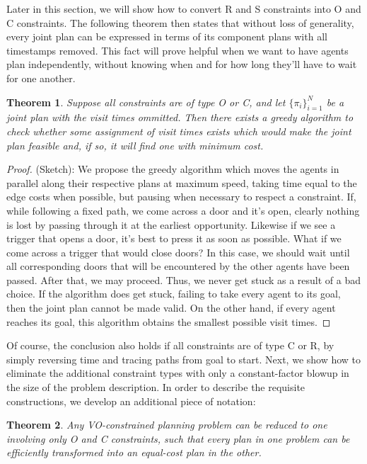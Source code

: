 \documentclass[letterpaper]{article}
\newtheorem{thm}{Theorem}
\begin{document}
Later in this section, we will show how to convert R and S constraints into O and C constraints. The following theorem then states that without loss of generality, every joint plan can be expressed in terms of its component plans with all timestamps removed. This fact will prove helpful when we want to have agents plan independently, without knowing when and for how long they'll have to wait for one another.

\begin{thm}
\label{thm:greedy}
Suppose all constraints are of type O or C, and let $\{\pi_i\}_{i=1}^N$ be a joint plan with the visit times ommitted. Then there exists a greedy algorithm to check whether some assignment of visit times exists which would make the joint plan feasible and, if so, it will find one with minimum cost.
\end{thm} 

\begin{proof}
(Sketch): We propose the greedy algorithm which moves the agents in parallel along their respective plans at maximum speed, taking time equal to the edge costs when possible, but pausing when necessary to respect a constraint. If, while following a fixed path, we come across a door and it's open, clearly nothing is lost by passing through it at the earliest opportunity. Likewise if we see a trigger that opens a door, it's best to press it as soon as possible. What if we come across a trigger that would close doors? In this case, we should wait until all corresponding doors that will be encountered by the other agents have been passed. After that, we may proceed. Thus, we never get stuck as a result of a bad choice. If the algorithm does get stuck, failing to take every agent to its goal, then the joint plan cannot be made valid. On the other hand, if every agent reaches its goal, this algorithm obtains the smallest possible visit times.
\end{proof}

Of course, the conclusion also holds if all constraints are of type C or R, by simply reversing time and tracing paths from goal to start. Next, we show how to eliminate the additional constraint types with only a constant-factor blowup in the size of the problem description. In order to describe the requisite constructions, we develop an additional piece of notation: 

\begin{thm}
\label{thm:OC}
Any VO-constrained planning problem can be reduced to one involving only O and C constraints, such that every plan in one problem can be efficiently transformed into an equal-cost plan in the other.
\end{thm}
\end{document}
